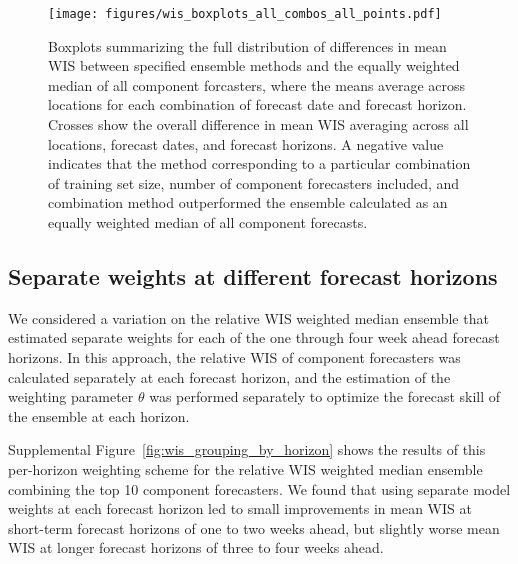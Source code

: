 \documentclass{article}
\begin{document}
\begin{figure}[H]
  \texttt{[image: figures/wis\_boxplots\_all\_combos\_all\_points.pdf]}
  \caption{Boxplots summarizing the full distribution of differences in mean WIS between specified ensemble methods and the equally weighted median of all component forcasters, where the means average across locations for each combination of forecast date and forecast horizon. Crosses show the overall difference in mean WIS averaging across all locations, forecast dates, and forecast horizons.
  A negative value indicates that the method corresponding to a particular combination of training set size, number of component forecasters included, and combination method outperformed the ensemble calculated as an equally weighted median of all component forecasts.}
  \label{fig:wis_combination_methods_all_points}
\end{figure}


\subsection{Separate weights at different forecast horizons}

We considered a variation on the relative WIS weighted median ensemble that estimated separate weights for each of the one through four week ahead forecast horizons. In this approach, the relative WIS of component forecasters was calculated separately at each forecast horizon, and the estimation of the weighting parameter $\theta$ was performed separately to optimize the forecast skill of the ensemble at each horizon.

Supplemental Figure~\ref{fig:wis_grouping_by_horizon} shows the results of this per-horizon weighting scheme for the relative WIS weighted median ensemble combining the top 10 component forecasters. We found that using separate model weights at each forecast horizon led to small improvements in mean WIS at short-term forecast horizons of one to two weeks ahead, but slightly worse mean WIS at longer forecast horizons of three to four weeks ahead. 
\end{document}
